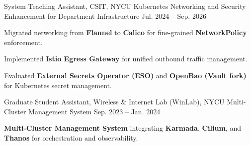 \begin{cventries}
  \cventry
    {System Teaching Assistant, CSIT, NYCU} %
    {Kubernetes Networking and Security Enhancement for Department Infrastructure} %
    {} %
    {Jul. 2024 -- Sep. 2026} %
    {
      \begin{cvitems}
        \item {Migrated networking from \textbf{Flannel} to \textbf{Calico} for fine-grained \textbf{NetworkPolicy} enforcement.}
        \item {Implemented \textbf{Istio Egress Gateway} for unified outbound traffic management.}
        \item {Evaluated \textbf{External Secrets Operator (ESO)} and \textbf{OpenBao (Vault fork)} for Kubernetes secret management.}
      \end{cvitems}
    }

  \cventry
    {Graduate Student Assistant, Wireless \& Internet Lab (WinLab), NYCU} %
    {Multi-Cluster Management System} %
    {} %
    {Sep. 2023 -- Jan. 2024} %
    {
      \begin{cvitems}
        \item {\textbf{Multi-Cluster Management System} integrating \textbf{Karmada}, \textbf{Cilium}, and \textbf{Thanos} for orchestration and observability.}
      \end{cvitems}
    }

\end{cventries}
